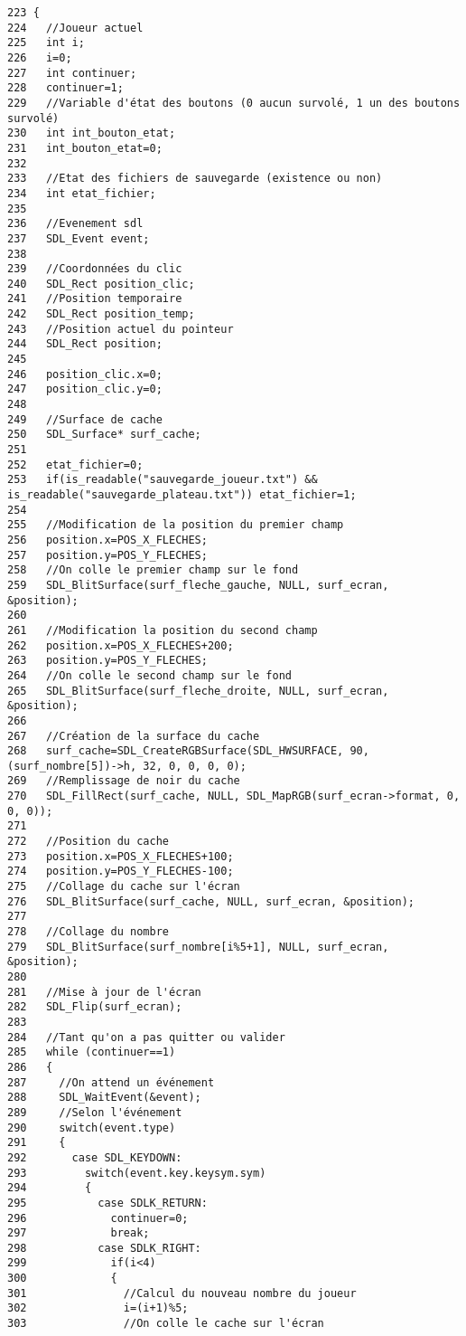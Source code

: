 \begin{Code}\begin{verbatim}223 {
224   //Joueur actuel
225   int i;
226   i=0;
227   int continuer;
228   continuer=1;
229   //Variable d'état des boutons (0 aucun survolé, 1 un des boutons survolé)
230   int int_bouton_etat;
231   int_bouton_etat=0;
232   
233   //Etat des fichiers de sauvegarde (existence ou non)
234   int etat_fichier;
235   
236   //Evenement sdl
237   SDL_Event event;
238   
239   //Coordonnées du clic
240   SDL_Rect position_clic;
241   //Position temporaire
242   SDL_Rect position_temp;
243   //Position actuel du pointeur
244   SDL_Rect position;
245   
246   position_clic.x=0;
247   position_clic.y=0;
248   
249   //Surface de cache
250   SDL_Surface* surf_cache;
251   
252   etat_fichier=0;
253   if(is_readable("sauvegarde_joueur.txt") && is_readable("sauvegarde_plateau.txt")) etat_fichier=1;
254   
255   //Modification de la position du premier champ
256   position.x=POS_X_FLECHES;
257   position.y=POS_Y_FLECHES;
258   //On colle le premier champ sur le fond
259   SDL_BlitSurface(surf_fleche_gauche, NULL, surf_ecran, &position);
260   
261   //Modification la position du second champ
262   position.x=POS_X_FLECHES+200;
263   position.y=POS_Y_FLECHES;
264   //On colle le second champ sur le fond
265   SDL_BlitSurface(surf_fleche_droite, NULL, surf_ecran, &position);
266   
267   //Création de la surface du cache
268   surf_cache=SDL_CreateRGBSurface(SDL_HWSURFACE, 90, (surf_nombre[5])->h, 32, 0, 0, 0, 0);
269   //Remplissage de noir du cache
270   SDL_FillRect(surf_cache, NULL, SDL_MapRGB(surf_ecran->format, 0, 0, 0));
271   
272   //Position du cache
273   position.x=POS_X_FLECHES+100;
274   position.y=POS_Y_FLECHES-100;
275   //Collage du cache sur l'écran
276   SDL_BlitSurface(surf_cache, NULL, surf_ecran, &position);
277   
278   //Collage du nombre
279   SDL_BlitSurface(surf_nombre[i%5+1], NULL, surf_ecran, &position);
280   
281   //Mise à jour de l'écran
282   SDL_Flip(surf_ecran);
283   
284   //Tant qu'on a pas quitter ou valider
285   while (continuer==1)
286   {
287     //On attend un événement
288     SDL_WaitEvent(&event);
289     //Selon l'événement
290     switch(event.type)
291     {
292       case SDL_KEYDOWN:
293         switch(event.key.keysym.sym)
294         {
295           case SDLK_RETURN:
296             continuer=0;
297             break;
298           case SDLK_RIGHT:
299             if(i<4)
300             {
301               //Calcul du nouveau nombre du joueur
302               i=(i+1)%5;
303               //On colle le cache sur l'écran

\end{verbatim}
\end{Code}
